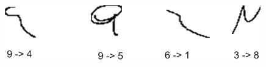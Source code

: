 \documentclass[times, 10pt,twocolumn]{article}
\begin{document}

\begin{table}[h]
\begin{center}
\caption[First Stage result table]{ Results of different stages }
\label{tab:ResultsStage1}
\end{center}
\end{table}

 \begin{figure}
	\centering
		\includegraphics[scale=0.25]{conf2.jpg}
	\caption[ A sample of the misclassified digits by the proposed system.]{}
	\label{fig:conff}

\end{figure}
\end{document}
